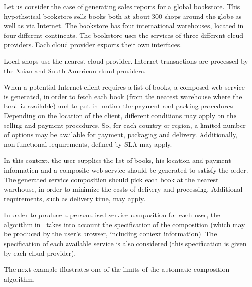 \begin{example}\label{Ex:rew1}
Let us consider the case of generating sales reports for a global bookstore.
This hypothetical bookstore sells books both at about 300 shops around the globe as well as via Internet.
The bookstore has four international warehouses, located in four different continents.
The bookstore uses the services of three different cloud providers.
Each cloud provider exports their own interfaces.

Local shops use the nearest cloud provider.
Internet transactions are processed by the Asian and South American cloud providers.

When a potential Internet client requires a list of books, a composed web service is generated, in order to fetch each book (from the nearest warehouse where the book is available) and to put in motion the payment and packing procedures.
Depending on the location of the client, different conditions may apply on the selling and payment procedures.
So, for each country or region, a limited number of options may be available for payment, packaging and delivery.
Additionally, non-functional requirements, defined by SLA may apply.

In this context, the user supplies the list of books, his location and payment information and a composite web service should be generated to satisfy the order.
The generated service composition should pick each book at the nearest warehouse, in order to minimize the costs of delivery and processing.
Additional requirements, such as delivery time, may apply.

In order to produce a personalised service composition for each user, the algorithm in~\cite{CostaAMR13} takes into account the specification of the composition (which may be produced by the user's browser, including context information).
The specification of each available service is also considered (this specification is given by each cloud provider).
~\hfill\openbox
\end{example}

The next example illustrates one of the limits of the automatic composition algorithm.

